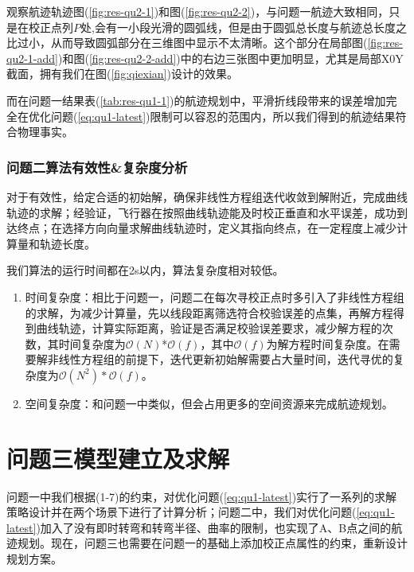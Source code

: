 观察航迹轨迹图(\ref{fig:res-qu2-1})和图(\ref{fig:res-qu2-2})，与问题一航迹大致相同，只是在校正点列$P$处,会有一小段光滑的圆弧线，但是由于圆弧总长度与航迹总长度之比过小，从而导致圆弧部分在三维图中显示不太清晰。这个部分在局部图(\ref{fig:res-qu2-1-add})和图(\ref{fig:res-qu2-2-add})中的右边三张图中更加明显，尤其是局部X0Y截面，拥有我们在图(\ref{fig:qiexian})设计的效果。

 而在问题一结果表(\ref{tab:res-qu1-1})的航迹规划中，平滑折线段带来的误差增加完全在优化问题(\ref{eq:qu1-latest})限制可以容忍的范围内，所以我们得到的航迹结果符合物理事实。

\subsubsection{问题二算法有效性\&复杂度分析}
对于有效性，给定合适的初始解，确保非线性方程组迭代收敛到解附近，完成曲线轨迹的求解；经验证，飞行器在按照曲线轨迹能及时校正垂直和水平误差，成功到达终点；在选择方向向量求解曲线轨迹时，定义其指向终点，在一定程度上减少计算量和轨迹长度。

我们算法的运行时间都在2s以内，算法复杂度相对较低。

\begin{enumerate}
    \item 时间复杂度：相比于问题一，问题二在每次寻校正点时多引入了非线性方程组的求解，为减少计算量，先以线段距离筛选符合校验误差的点集，再解方程得到曲线轨迹，计算实际距离，验证是否满足校验误差要求，减少解方程的次数，其时间复杂度为$\mathcal{O}(N)$*$\mathcal{O}(f)$，其中$\mathcal{O}(f)$为解方程时间复杂度。在需要解非线性方程组的前提下，迭代更新初始解需要占大量时间，迭代寻优的复杂度为$\mathcal{O}(N^2)*\mathcal{O}(f)$。
	\item 空间复杂度：和问题一中类似，但会占用更多的空间资源来完成航迹规划。
\end{enumerate}







\newpage
\section{问题三模型建立及求解}
问题一中我们根据(1-7)的约束，对优化问题(\ref{eq:qu1-latest})实行了一系列的求解策略设计并在两个场景下进行了计算分析；问题二中，我们对优化问题(\ref{eq:qu1-latest})加入了没有即时转弯和转弯半径、曲率的限制，也实现了A、B点之间的航迹规划。现在，问题三也需要在问题一的基础上添加校正点属性的约束，重新设计规划方案。

